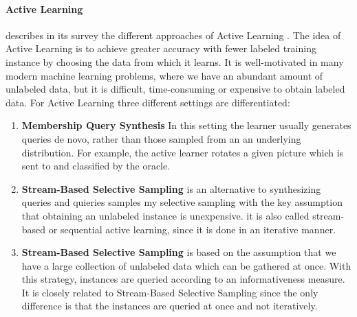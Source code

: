 \paragraph{Active Learning}
\citeauthor{Settles2009ActiveLL} describes in its survey the different approaches of Active Learning \cite{Settles2009ActiveLL}.
The idea of Active Learning is to achieve greater accuracy with fewer labeled training instance by choosing the data from which it learns.
It is well-motivated in many modern machine learning problems, where we have an abundant amount of unlabeled data, but it is difficult, time-consuming or expensive to obtain labeled data.
For Active Learning three different settings are differentiated:
\begin{enumerate}
    \item \textbf{Membership Query Synthesis}
    In this setting the learner usually generates queries de novo, rather than those sampled from an an underlying distribution. 
    For example, the active learner rotates a given picture which is sent to and classified by the oracle.
    
    \item \textbf{Stream-Based Selective Sampling}
    is an alternative to synthesizing queries and quieries samples my selective sampling with the key assumption that obtaining an unlabeled instance is unexpensive.
    it is also called stream-based or sequential active learning, since it is done in an iterative manner.
    
    \item \textbf{Stream-Based Selective Sampling} is based on the assumption that we have a large collection of unlabeled data which can be gathered at once.
    With this strategy, instances are queried according to an informativeness measure.
    It is closely related to Stream-Based Selective Sampling since the only difference is that the instances are queried at once and not iteratively.
\end{enumerate}




